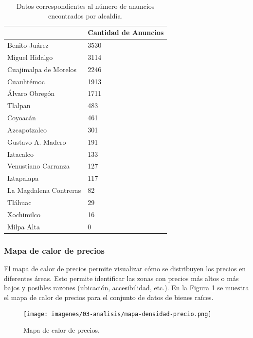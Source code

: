 \begin{table}[H]
\centering
\begin{tabular}{|l|l|}
\hline
\rowcolor{azulclaro}
\multicolumn{1}{|c|}{\textbf{Alcaldía}} & \multicolumn{1}{c|}{\textbf{Cantidad de Anuncios}} \\
\hline
Benito Juárez & 3530 \\
\hline
Miguel Hidalgo & 3114 \\
\hline
Cuajimalpa de Morelos & 2246 \\
\hline
Cuauhtémoc & 1913 \\
\hline
Álvaro Obregón & 1711 \\
\hline
Tlalpan & 483 \\
\hline
Coyoacán & 461 \\
\hline
Azcapotzalco & 301 \\
\hline
Gustavo A. Madero & 191 \\
\hline
Iztacalco & 133 \\
\hline
Venustiano Carranza & 127 \\
\hline
Iztapalapa & 117 \\
\hline
La Magdalena Contreras & 82 \\
\hline
Tláhuac & 29 \\
\hline
Xochimilco & 16 \\
\hline
Milpa Alta & 0 \\
\hline
\end{tabular}
\caption{Datos correspondientes al número de anuncios encontrados por alcaldía.}
\label{table:mapa_calor_densidad_anuncios}
\end{table}
\subsubsection{Mapa de calor de precios}

El mapa de calor de precios permite visualizar cómo se distribuyen los precios
en diferentes áreas. Esto permite identificar las zonas con precios más altos o
más bajos y posibles razones (ubicación, accesibilidad, etc.). En la Figura
\ref{fig:mapa_calor_precios} se muestra el mapa de calor de precios para el
conjunto de datos de bienes raíces.

\begin{figure}[H]
  \centering
  \texttt{[image: imagenes/03-analisis/mapa-densidad-precio.png]}
  \caption{Mapa de calor de precios.}
  \label{fig:mapa_calor_precios}
\end{figure}

